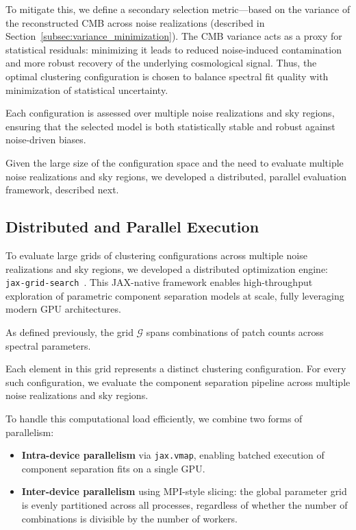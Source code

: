 \documentclass[%
 reprint,
bibnotes,
 amsmath,amssymb,
 aps,
floatfix, 
]{revtex4-2}
\begin{document}
To mitigate this, we define a secondary selection metric—based on the variance of the reconstructed CMB across noise realizations (described in Section~\ref{subsec:variance_minimization}). The CMB variance acts as a proxy for statistical residuals: minimizing it leads to reduced noise-induced contamination and more robust recovery of the underlying cosmological signal. Thus, the optimal clustering configuration is chosen to balance spectral fit quality with minimization of statistical uncertainty.

Each configuration is assessed over multiple noise realizations and sky regions, ensuring that the selected model is both statistically stable and robust against noise-driven biases.

Given the large size of the configuration space and the need to evaluate multiple noise realizations and sky regions, we developed a distributed, parallel evaluation framework, described next.


\subsection{Distributed and Parallel Execution}
\label{subsec:parallel_grid_search}

To evaluate large grids of clustering configurations across multiple noise realizations and sky regions, we developed a distributed optimization engine: \texttt{jax-grid-search}~\citep{kabalan2025jaxgridsearch}. This JAX-native framework enables high-throughput exploration of parametric component separation models at scale, fully leveraging modern GPU architectures.

As defined previously, the grid \( \mathcal{G} \) spans combinations of patch counts across spectral parameters. 

Each element in this grid represents a distinct clustering configuration. For every such configuration, we evaluate the component separation pipeline across multiple noise realizations and sky regions.

To handle this computational load efficiently, we combine two forms of parallelism:
\begin{itemize}
    \item \textbf{Intra-device parallelism} via \texttt{jax.vmap}, enabling batched execution of component separation fits on a single GPU.
    \item \textbf{Inter-device parallelism} using MPI-style slicing: the global parameter grid is evenly partitioned across all processes, regardless of whether the number of combinations is divisible by the number of workers.
\end{itemize}
\end{document}
